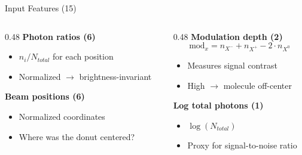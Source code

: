 \documentclass[aspectratio=169]{beamer}
\begin{document}
\begin{frame}{Input Features (15)}

    \begin{columns}[T]
        \begin{column}{0.48\textwidth}
            \textbf{Photon ratios (6)}
            \begin{itemize}
                \item $n_i / N_{total}$ for each position
                \item Normalized $\rightarrow$ brightness-invariant
            \end{itemize}

            \vspace{0.4cm}

            \textbf{Beam positions (6)}
            \begin{itemize}
                \item Normalized coordinates
                \item Where was the donut centered?
            \end{itemize}
        \end{column}

        \begin{column}{0.48\textwidth}
            \textbf{Modulation depth (2)}
            \begin{equation*}
                \text{mod}_x = n_{X^-} + n_{X^+} - 2 \cdot n_{X^0}
            \end{equation*}
            \begin{itemize}
                \item Measures signal contrast
                \item High $\rightarrow$ molecule off-center
            \end{itemize}

            \vspace{0.4cm}

            \textbf{Log total photons (1)}
            \begin{itemize}
                \item $\log(N_{total})$
                \item Proxy for signal-to-noise ratio
            \end{itemize}
        \end{column}
    \end{columns}

\end{frame}
\end{document}
